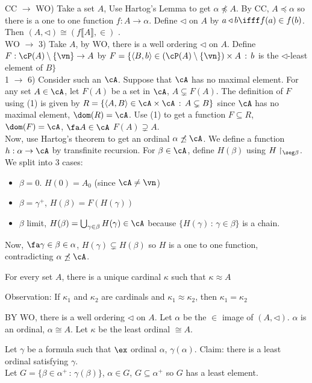 \begin{pf}
    CC $\to$ WO) Take a set $A$, Use Hartog's Lemma to get $\alpha \not\preceq A$. By CC, $A \preceq \alpha$ so there is a one to one function $f: A \to \alpha$. Define $\triangleleft$ on $A$ by $a \triangleleft b \ifff f(a) \in f(b)$. Then $(A, \triangleleft) \cong (f\llbracket A \rrbracket, \in )$ . \\
    WO $\to$ 3) Take $A$, by WO, there is a well ordering $\triangleleft$ on $A$. Define $F: \cP(A) \setminus \{\vn\} \to A$ by $F = \{ \langle B, b \rangle \in (\cP(A) \setminus \{\vn\}) \times A \, : \, b$ is the $\triangleleft$-least element of $B\}$ \\ 
    1 $\to$ 6) Consider such an $\cA$. Suppose that $\cA$ has no maximal element. For any set $A \in \cA$, let $F(A)$ be a set in $\cA$, $A \subsetneq F(A)$. The definition of $F$ using (1) is given by $R = \{ \langle A, B \rangle \in \cA \times \cA \, : \, A \subsetneq B\}$ since $\cA$ has no maximal element, $\dom(R) = \cA$. Use (1) to get a function $F \subseteq R$, $\dom(F) = \cA$, $\fa A \in \cA$ $F(A) \supsetneq A$. \\
    Now, use Hartog's theorem to get an ordinal $\alpha \not\preceq \cA$. We define a function $h: \alpha \to \cA$ by transfinite recursion. For $\beta \in \cA$, define $H(\beta)$ using $H \upharpoonright_{\seg \beta}$. We split into 3 cases: 
    \begin{itemize}
        \item $\beta = 0$. $H(0) = A_0$ (since $\cA \neq \vn$)
        \item $\beta = \gamma^+$, $H(\beta) = F(H(\gamma))$ 
        \item $\beta$ limit, $H(\beta) = \bigcup_{\gamma \in \beta} H(\gamma) \in \cA$ because $\{ H(\gamma) \, : \, \gamma \in \beta\}$ is a chain. 
    \end{itemize}
    Now, $\fa \gamma \in \beta \in \alpha$, $H(\gamma) \subsetneq H(\beta)$ so $H$ is a one to one function, contradicting $\alpha \not\preceq \cA$. 
\end{pf}

\begin{theorem}
    For every set $A$, there is a unique cardinal $\kappa$ such that $\kappa \approx A$
\end{theorem}

\noindent
Observation: If $\kappa_1$ and $\kappa_2$ are cardinals and $\kappa_1 \approx \kappa_2$, then $\kappa_1 = \kappa_2$ 

\begin{pf}
    BY WO, there is a well ordering $\triangleleft$ on $A$. Let $\alpha$ be the $\in$ image of $(A, \triangleleft)$. $\alpha$ is an ordinal, $\alpha \cong A$. Let $\kappa$ be the least ordinal $\cong A$. 
\end{pf}

\noindent
Let $\gamma$ be a formula such that $\ex$ ordinal $\alpha$, $\gamma(\alpha)$. Claim: there is a least ordinal satisfying $\gamma$. \\
Let $G = \{\beta \in \alpha^+ \, : \, \gamma(\beta)\}$, $\alpha \in G$, $G \subseteq \alpha^+$ so $G$ has a least element. 